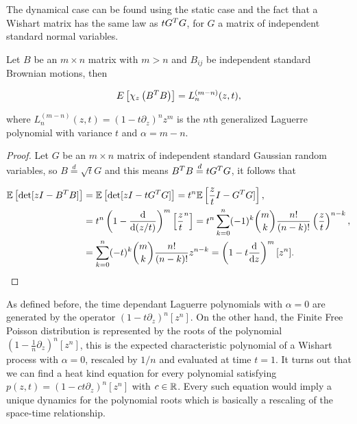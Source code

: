    The dynamical case can be found using the static case and the fact that a Wishart matrix has the same law as $tG^TG$, for $G$ a matrix of independent standard normal variables.

\begin{theorem} \label{thm:wishart_is_laguerre}
    Let $B$ be an $m\times n$ matrix with $m>n$ and $B_{ij}$ be independent standard Brownian motions, then 

    \begin{equation*}
        E\left[ \chi_z\left( B^TB\right) \right] = L_n^{(m-n)}(z,t),
    \end{equation*}

    \noindent where $L_n^{(m-n)}(z,t) = \left( 1 - t\partial_z \right)^n z^m$ is the $n$th generalized Laguerre polynomial with variance $t$ and $\alpha = m-n$.
\end{theorem}

\begin{proof}
    Let $G$ be an $m\times n$ matrix of independent standard Gaussian random variables, so $B \overset{d}{=} \sqrt{t}G$ and this means $B^TB \overset{d}{=} t G^T G$, it follows that

    \begin{align*}
        \mathbb E \left[ \det[zI - B^T B] \right] &= \mathbb E \left[ \det[zI - t G^T G] \right] = t^n \mathbb E \left[ \frac zt I - G^TG] \right], \\
        &= t^n \left(1 - \frac{\mathrm d }{\mathrm d (z/t)}\right)^m\left[ \frac{z}{t}^n\right] = t^n\sum_{k=0}^n (-1)^k \binom mk \frac{n!}{(n-k)!} \left(\frac zt\right)^{n-k},\\
        &= \sum_{k=0}^n (-t)^k \binom mk \frac{n!}{(n-k)!} z^{n-k} = \left( 1 - t\frac{\mathrm d}{\mathrm d z} \right)^m [z^n].
    \end{align*}
\end{proof}

    As defined before, the time dependant Laguerre polynomials with $\alpha=0$ are generated by the operator $(1-t\partial_z)^{n}[z^n]$. On the other hand, the Finite Free Poisson distribution is represented by the roots of the polynomial $(1-\frac1n\partial_z)^{n}[z^n]$, this is the expected characteristic polynomial of a Wishart process with $\alpha=0$, rescaled by $1/n$ and evaluated at time $t=1$. It turns out that we can find a heat kind equation for every polynomial satisfying $p(z,t)=(1-ct\partial_z)^n[z^n]$ with $c \in\mathbb R$. Every such equation would imply a unique dynamics for the polynomial roots which is basically a rescaling of the space-time relationship.

